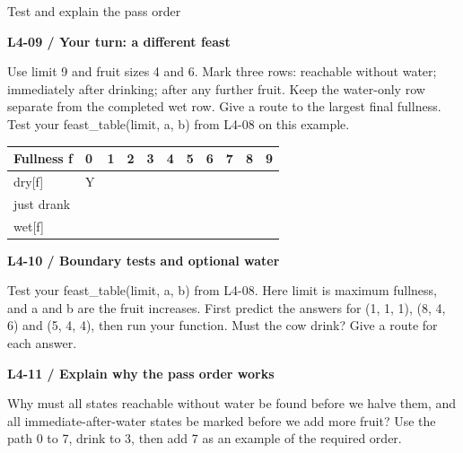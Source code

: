 \documentclass[11pt,a4paper]{article}
\begin{document}
\par\noindent\begin{minipage}{\linewidth}
{\heavy\fontsize{12}{15}\selectfont Test and explain the pass order\par}\medskip
\textbf{L4-09 / Your turn: a different feast}\par\smallskip Use limit 9 and fruit sizes 4 and 6. Mark three rows: reachable without water; immediately after drinking; after any further fruit. Keep the water-only row separate from the completed wet row. Give a route to the largest final fullness. Test your feast\_table(limit, a, b) from L4-08 on this example.\par
\par\medskip \begingroup\footnotesize\setlength{\tabcolsep}{4pt}\renewcommand{\arraystretch}{1.35}\begin{tabularx}{\linewidth}{>{\raggedright\arraybackslash}l>{\raggedright\arraybackslash}X>{\raggedright\arraybackslash}X>{\raggedright\arraybackslash}X>{\raggedright\arraybackslash}X>{\raggedright\arraybackslash}X>{\raggedright\arraybackslash}X>{\raggedright\arraybackslash}X>{\raggedright\arraybackslash}X>{\raggedright\arraybackslash}X>{\raggedright\arraybackslash}X}\toprule\textbf{Fullness f} & \textbf{0} & \textbf{1} & \textbf{2} & \textbf{3} & \textbf{4} & \textbf{5} & \textbf{6} & \textbf{7} & \textbf{8} & \textbf{9}\\\midrule
dry[f] & Y &  &  &  &  &  &  &  &  & \\
just drank &  &  &  &  &  &  &  &  &  & \\
wet[f] &  &  &  &  &  &  &  &  &  & \\
\bottomrule\end{tabularx}\endgroup\par\medskip 
\end{minipage}\par\vspace{4mm}
\par\noindent\begin{minipage}{\linewidth}
\textbf{L4-10 / Boundary tests and optional water}\par\smallskip Test your feast\_table(limit, a, b) from L4-08. Here limit is maximum fullness, and a and b are the fruit increases. First predict the answers for (1, 1, 1), (8, 4, 6) and (5, 4, 4), then run your function. Must the cow drink? Give a route for each answer.\par
\end{minipage}\par\vspace{4mm}
\par\noindent\begin{minipage}{\linewidth}
\textbf{L4-11 / Explain why the pass order works}\par\smallskip Why must all states reachable without water be found before we halve them, and all immediate-after-water states be marked before we add more fruit? Use the path 0 to 7, drink to 3, then add 7 as an example of the required order.\par
\end{minipage}\par\vspace{4mm}
\end{document}
